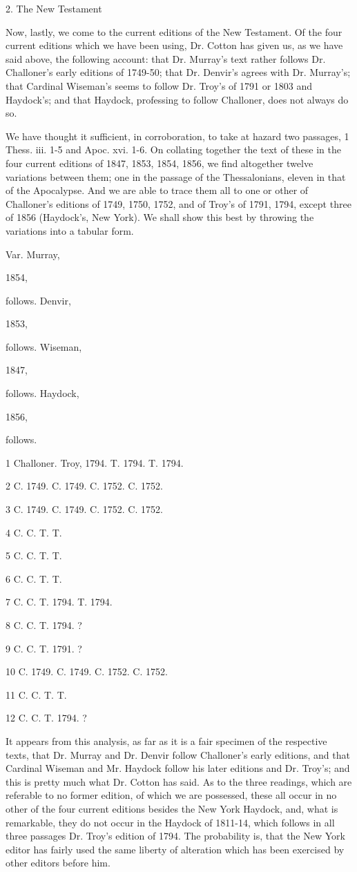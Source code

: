 2. The New Testament

Now, lastly, we come to the current editions of the New Testament.
Of the four current editions which we have been using, Dr. Cotton has
given us, as we have said above, the following account: that Dr.
Murray's text rather follows Dr. Challoner's early editions of
1749-50; that Dr. Denvir's agrees with Dr. Murray's; that Cardinal
Wiseman's seems to follow Dr. Troy's of 1791 or 1803 and Haydock's;
and that Haydock, professing to follow Challoner, does not always do
so.

We have thought it sufficient, in corroboration, to take at hazard
two passages, 1 Thess. iii. 1-5 and Apoc. xvi. 1-6. On collating
together the text of these in the four current editions of 1847, 1853,
1854, 1856, we find altogether twelve variations between them; one in
the passage of the Thessalonians, eleven in that of the
Apocalypse. And we are able to trace them all to one or other of
Challoner's editions of 1749, 1750, 1752, and of Troy's of 1791, 1794,
except three of 1856 (Haydock's, New York). We shall show this best by
throwing the variations into a tabular form.

Var.
Murray,

1854,

follows.
Denvir,

1853,

follows.
Wiseman,

1847,

follows.
Haydock,

1856,

follows.

1
Challoner.
Troy, 1794.
T. 1794.
T. 1794.

2
C. 1749.
C. 1749.
C. 1752.
C. 1752.

3
C. 1749.
C. 1749.
C. 1752.
C. 1752.

4
C.
C.
T.
T.

5
C.
C.
T.
T.

6
C.
C.
T.
T.

7
C.
C.
T. 1794.
T. 1794.

8
C.
C.
T. 1794.
?

9
C.
C.
T. 1791.
?

10
C. 1749.
C. 1749.
C. 1752.
C. 1752.

11
C.
C.
T.
T.

12
C.
C.
T. 1794.
?

It appears from this analysis, as far as it is a fair specimen of
the respective texts, that Dr. Murray and Dr. Denvir follow Challoner's
early editions, and that Cardinal Wiseman and Mr. Haydock follow his
later editions and Dr. Troy's; and this is pretty much what Dr. Cotton
has said. As to the three readings, which are referable to no former
edition, of which we are possessed, these all occur in no other of the
four current editions besides the New York Haydock, and, what is
remarkable, they do not occur in the Haydock of 1811-14, which follows
in all three passages Dr. Troy's edition of 1794. The probability
is, that the New York editor has fairly used the same liberty of
alteration which has been exercised by other editors before him.

